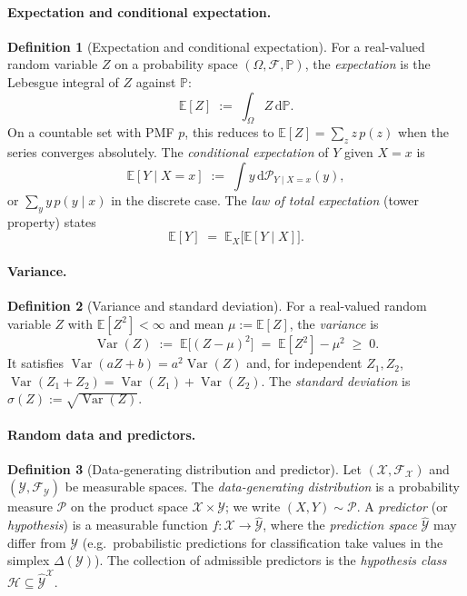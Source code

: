 \documentclass[11pt]{article}
\theoremstyle{definition}
\newtheorem{definition}{Definition}
\begin{document}
\paragraph{Expectation and conditional expectation.}

\begin{definition}[Expectation and conditional expectation]
For a real-valued random variable $Z$ on a probability space
$(\Omega, \mathcal{F}, \mathbb{P})$, the \emph{expectation} is the Lebesgue
integral of $Z$ against $\mathbb{P}$:
\[
  \mathbb{E}[Z] \;:=\; \int_{\Omega} Z\, \mathrm{d}\mathbb{P}.
\]
On a countable set with PMF $p$, this reduces to
$\mathbb{E}[Z] = \sum_{z} z\, p(z)$ when the series converges absolutely.
The \emph{conditional expectation} of $Y$ given $X = x$ is
\[
  \mathbb{E}[Y \mid X = x] \;:=\; \int y\, \mathrm{d}\mathcal{P}_{Y \mid X = x}(y),
\]
or $\sum_{y} y\, p(y \mid x)$ in the discrete case. The
\emph{law of total expectation} (tower property) states
\[
  \mathbb{E}[Y] \;=\; \mathbb{E}_{X}\!\bigl[\mathbb{E}[Y \mid X]\bigr].
\]
\end{definition}

\paragraph{Variance.}

\begin{definition}[Variance and standard deviation]
For a real-valued random variable $Z$ with $\mathbb{E}[Z^{2}] < \infty$ and
mean $\mu := \mathbb{E}[Z]$, the \emph{variance} is
\[
  \operatorname{Var}(Z) \;:=\; \mathbb{E}\!\bigl[(Z - \mu)^{2}\bigr]
  \;=\; \mathbb{E}[Z^{2}] - \mu^{2} \;\geq\; 0.
\]
It satisfies $\operatorname{Var}(aZ + b) = a^{2}\operatorname{Var}(Z)$ and,
for independent $Z_{1}, Z_{2}$,
$\operatorname{Var}(Z_{1} + Z_{2}) = \operatorname{Var}(Z_{1}) + \operatorname{Var}(Z_{2})$.
The \emph{standard deviation} is $\sigma(Z) := \sqrt{\operatorname{Var}(Z)}$.
\end{definition}

\paragraph{Random data and predictors.}

\begin{definition}[Data-generating distribution and predictor]
Let $(\mathcal{X}, \mathcal{F}_{\mathcal{X}})$ and
$(\mathcal{Y}, \mathcal{F}_{\mathcal{Y}})$ be measurable spaces. The
\emph{data-generating distribution} is a probability measure $\mathcal{P}$ on
the product space $\mathcal{X} \times \mathcal{Y}$; we write
$(X, Y) \sim \mathcal{P}$. A \emph{predictor} (or \emph{hypothesis}) is a
measurable function $f : \mathcal{X} \to \widehat{\mathcal{Y}}$, where the
\emph{prediction space} $\widehat{\mathcal{Y}}$ may differ from $\mathcal{Y}$
(e.g.\ probabilistic predictions for classification take values in the
simplex $\Delta(\mathcal{Y})$). The collection of admissible predictors is
the \emph{hypothesis class} $\mathcal{H} \subseteq \widehat{\mathcal{Y}}^{\mathcal{X}}$.
\end{definition}
\end{document}
